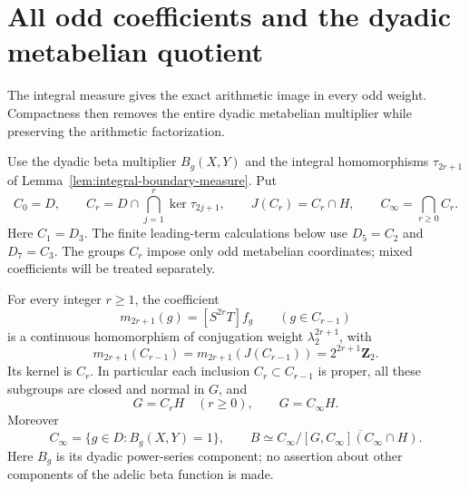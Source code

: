 \section{All odd coefficients and the dyadic metabelian quotient}
\label{sec:uniform-dyadic-normalization}

The integral measure gives the exact arithmetic image in every odd
weight. Compactness then removes the entire dyadic metabelian multiplier
while preserving the arithmetic factorization.

Use the dyadic beta multiplier $B_g(X,Y)$ and the integral
homomorphisms $\tau_{2r+1}$ of
Lemma~\ref{lem:integral-boundary-measure}. Put
\[
 C_0=D,\qquad
 C_r=D\cap\bigcap_{j=1}^{r}\ker\tau_{2j+1},\qquad
 J(C_r)=C_r\cap H,\qquad C_\infty=\bigcap_{r\ge0}C_r.
\]
Here $C_1=D_3$. The finite leading-term calculations below use
$D_5=C_2$ and $D_7=C_3$. The groups $C_r$ impose only odd
metabelian coordinates; mixed coefficients will be treated separately.

\begin{theorem}\label{thm:uniform-odd-arithmetic-image}
For every integer $r\ge1$, the coefficient
\[
 m_{2r+1}(g)=[S^{2r}T]f_g\qquad(g\in C_{r-1})
\]
is a continuous homomorphism of conjugation weight
$\lambda_2^{2r+1}$, with
\[
 m_{2r+1}(C_{r-1})=m_{2r+1}(J(C_{r-1}))
                 =2^{2r+1}\mathbf Z_2.
\]
Its kernel is $C_r$. In particular each inclusion
$C_r\subset C_{r-1}$ is proper, all these subgroups are closed and
normal in $G$, and
\[
 G=C_rH\quad(r\ge0),\qquad G=C_\infty H.
\]
Moreover
\[
 C_\infty=\{g\in D:B_g(X,Y)=1\},\qquad
 B\simeq C_\infty/
       \overline{[G,C_\infty](C_\infty\cap H)}.
\]
Here $B_g$ is its dyadic power-series component; no assertion about
other components of the adelic beta function is made.
\end{theorem}

